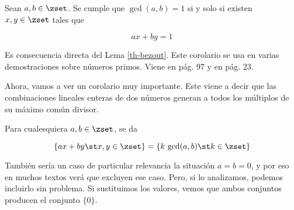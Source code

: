 \begin{corollary}%
\label{cor-comb-lin-primos-rel}
  Sean $a, b \in \zset$. Se cumple que $\gcd(a, b) = 1$ si y solo si existen
  $x, y \in \zset$ tales que

  $$ ax + by = 1 $$
\end{corollary}

Es consecuencia directa del Lema \ref{th-bezout}. Este corolario se usa en
varias demostraciones sobre números primos. Viene en \cite{rosen} pág. 97 y
en \cite{burton} pág. 23.

Ahora, vamos a ver un corolario muy importante. Este viene a decir que las
combinaciones lineales enteras de dos números generan a todos los múltiplos
de su máximo común divisor.

\begin{corollary}\label{cor-mult-mcd}
  Para cualesquiera $a, b \in \zset$, se da

  $$ \{ax + by \st x, y \in \zset\} = \{k \, \gcd(a, b) \st k \in \zset\} $$
\end{corollary}

También sería un caso de particular relevancia la situación $a = b = 0$, y
por eso en muchos textos verá que excluyen ese caso. Pero, si lo analizamos,
podemos incluirlo sin problema. Si sustituimos los valores, vemos que ambos
conjuntos producen el conjunto $\{0\}$.

